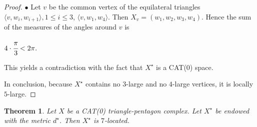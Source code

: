 \documentclass{amsart}
\newtheorem{theorem}{Theorem}[section]
\theoremstyle{definition}
\theoremstyle{remark}
\numberwithin{equation}{section}
\begin{document}
\begin{proof}
$\bullet$ Let $v$ be the common vertex of the equilateral triangles $\langle v, w_{i}, w_{i+1} \rangle, 1 \leq i \leq 3$, $\langle v, w_{1}, w_{4} \rangle$. Then $X_{v} = (w_{1}, w_{2}, w_{3}, w_{4})$. Hence the sum of the measures of the angles around $v$ is
\begin{center}
$4 \cdot \cfrac{\pi}{3} < 2 \pi.$
\end{center} This yields a contradiction with the fact that $X^{\star}$ is a CAT(0) space. 

In conclusion, because $X^{\star}$ contains no $3$-large and no $4$-large vertices, it is locally $5$-large.

\end{proof}



\begin{theorem}\label{3.3}
Let $X$ be a CAT(0) triangle-pentagon complex.  Let $X^{\star}$ be endowed with the metric $d^{\star}$. Then $X^{\star}$ is $7$-located. 
\end{theorem}
\end{document}
